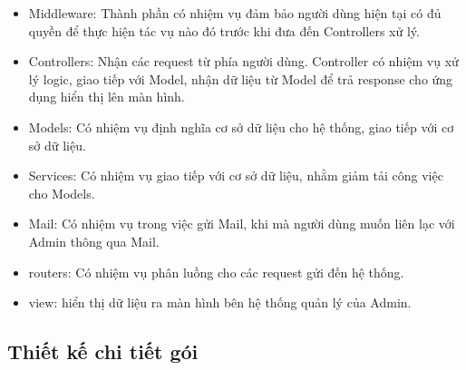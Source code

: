 \documentclass[../DoAn.tex]{subfiles}
\begin{document}
\begin{itemize}
    \item Middleware: Thành phần có nhiệm vụ đảm bảo người dùng hiện tại có đủ quyền để thực hiện tác vụ nào đó trước khi đưa đến Controllers xử lý.
    \item Controllers: Nhận các request từ phía người dùng. Controller có nhiệm vụ xử lý logic, giao tiếp với Model, nhận dữ liệu từ Model để trả response cho ứng dụng hiển thị lên màn hình.
    \item Models: Có nhiệm vụ định nghĩa cơ sở dữ liệu cho hệ thống, giao tiếp với cơ sở dữ liệu.
    \item Services: Có nhiệm vụ giao tiếp với cơ sở dữ liệu, nhằm giảm tải công việc cho Models.
    \item Mail: Có nhiệm vụ trong việc gửi Mail, khi mà người dùng muốn liên lạc với Admin thông qua Mail.
    \item routers: Có nhiệm vụ phân luồng cho các request gửi đến hệ thống.
    \item view: hiển thị dữ liệu ra màn hình bên hệ thống quản lý của Admin.
\end{itemize}
\subsection{Thiết kế chi tiết gói}
\end{document}
